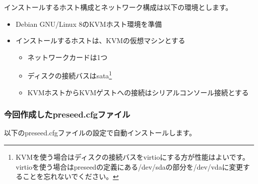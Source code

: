\documentclass[mingoth,a4paper]{jsarticle}
\begin{document}
インストールするホスト構成とネットワーク構成は以下の環境とします。

\begin{itemize}
\item Debian GNU/Linux 8のKVMホスト環境を準備
\item インストールするホストは、KVMの仮想マシンとする
  \begin{itemize}
  \item ネットワークカードは1つ
  \item ディスクの接続バスはsata\footnote{KVMを使う場合はディスクの接続バスをvirtioにする方が性能はよいです。virtioを使う場合はpreseedの定義にある/dev/sdaの部分を/dev/vdaに変更することを忘れないでください。}
  \item KVMホストからKVMゲストへの接続はシリアルコンソール接続とする
  \end{itemize}
\end{itemize}

\subsubsection{今回作成したpreseed.cfgファイル}

以下のpreseed.cfgファイルの設定で自動インストールします。
\end{document}
